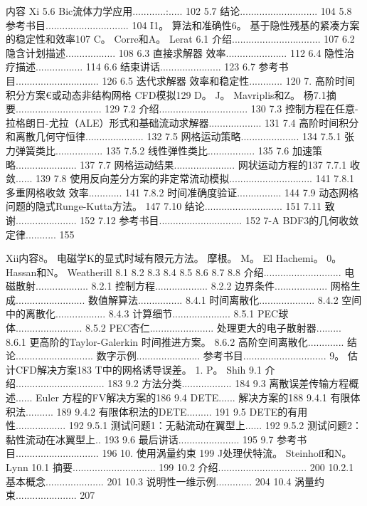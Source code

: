 \documentclass[UTF8,11pt,a4paper,openany,fontset=fandol]{ctexbook}
\begin{document}
内容 Xi 5.6 Bic流体力学应用............:..... 102 5.7 结论............................ 104 5.8 参考书目.............................. 104 I1。 算法和准确性6。 基于隐性残基的紧凑方案的稳定性和效率107 C。 Corre和A。 Lerat 6.1 介绍................................ 107 6.2 隐含计划描述.................. 108 6.3 直接求解器 效率...................... 112 6.4 隐性治疗描述................. 114 6.6 结束讲话...................... 123 6.7 参考书目.............................. 126 6.5 迭代求解器 效率和稳定性............ 120 7. 高阶时间积分方案€或动态非结构网格 CFD模拟129 D。 J。 Mavriplis和Z。 杨7.1摘要............................... 129 7.2 介绍................................ 130 7.3 控制方程在任意-拉格朗日-尤拉（ALE）形式和基础流动求解器................... 131 7.4 高阶时间积分和离散几何守恒律..................... 132 7.5 网格运动策略..................... 134 7.5.1 张力弹簧类比................. 135 7.5.2 线性弹性类比................. 135 7.6 加速策略...................... 137 7.7 网格运动结果...................... 网状运动方程的137 7.7.1 收敛...... 139 7.8 使用反向差分方案的非定常流动模拟.............................. 141 7.8.1 多重网格收敛 效率............ 141 7.8.2 时间准确度验证................ 144 7.9 动态网格问题的隐式Runge-Kutta方法。 147 7.10 结论............................ 151 7.11 致谢...................... 152 7.12 参考书目.............................. 152 7-A BDF3的几何收敛定律........... 155

Xii内容8。 电磁学K的显式时域有限元方法。 摩根。 M。 El Hachemi。 0。 Hassan和N。 Weatherill 8.1 8.2 8.3 8.4 8.5 8.6 8.7 8.8 介绍............................ 电磁散射................... 8.2.1 控制方程................... 8.2.2 边界条件................... 网格生成......................... 数值解算法................ 8.4.1 时间离散化.................... 8.4.2 空间中的离散化.................. 8.4.3 计算细节..................... 8.5.1 PEC球体........................ 8.5.2 PEC杏仁....................... 处理更大的电子散射器......... 8.6.1 更高阶的Taylor-Galerkin 时间推进方案。 8.6.2 高阶空间离散化............. 结论............................ 数字示例....................... 参考书目.............................. 9。 估计CFD解决方案183 T中的网格诱导误差。 1. P。 Shih 9.1 介绍................................ 183 9.2 方法分类.................. 184 9.3 离散误差传输方程概述...... Euler 方程的FV解决方案的186 9.4 DETE...... 解决方案的188 9.4.1 有限体积法.......... 189 9.4.2 有限体积法的DETE......... 191 9.5 DETE的有用性.................. 192 9.5.1 测试问题1：无黏流动在翼型上...... 192 9.5.2 测试问题2：黏性流动在冰翼型上.. 193 9.6 最后讲话...................... 195 9.7 参考书目.............................. 196 10. 使用涡量约束 199 J处理伏特流。 Steinhoff和N。 Lynn 10.1 摘要.............................. 199 10.2 介绍................................ 200 10.2.1 基本概念..................... 201 10.3 说明性一维示例............. 204 10.4 涡量约束...................... 207
\end{document}

